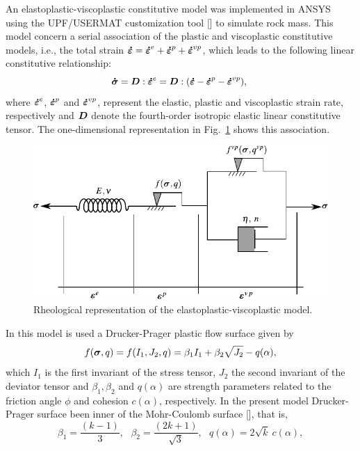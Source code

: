 \documentclass[a4paper,fleqn]{cas-sc}
\begin{document}
An elastoplastic-viscoplastic constitutive model was implemented in ANSYS using the UPF/USERMAT customization tool [] to simulate rock mass.  This model concern a serial association of the plastic and viscoplastic constitutive models, i.e., the total strain $\boldsymbol{\dot{\varepsilon}} = \boldsymbol{\dot{\varepsilon}}^{e} + \boldsymbol{\dot{\varepsilon}}^{p} + \boldsymbol{\dot{\varepsilon}}^{vp}$, which leads to the following linear constitutive relationship:
\begin{equation} \label{eq_constitutive_relationship_epvp}
	\boldsymbol{\dot{\sigma}} = \boldsymbol{D} : \boldsymbol{\dot{\varepsilon}}^{e} = \boldsymbol{D} : (\boldsymbol{\dot{\varepsilon}} - \boldsymbol{\dot{\varepsilon}}^{p} - \boldsymbol{\dot{\varepsilon}}^{vp}),\;
\end{equation}
where $\boldsymbol{\dot{\varepsilon}}^{e}$, $\boldsymbol{\dot{\varepsilon}}^{p}$ and $\boldsymbol{\dot{\varepsilon}}^{vp}$, represent the elastic, plastic and viscoplastic strain rate, respectively and $\boldsymbol{D}$ denote the fourth-order isotropic elastic linear constitutive tensor. The one-dimensional representation in Fig.~\ref{reological_scheme} shows this association. 
\begin{figure}[h!]
	\centering
	\includegraphics[scale=1]{Rheological representation.pdf}
	\caption{Rheological representation of the elastoplastic-viscoplastic model.}
	\label{reological_scheme}
\end{figure}
In this model is used a Drucker-Prager plastic flow surface given by
\begin{equation}
	\label{eq:f_Drucker_Prager}
	f(\boldsymbol{\sigma},q) = f(I_1,J_2,q) = \beta_1 I_1 +\beta_2 \sqrt{J_2}-q(\alpha),
\end{equation}
which $I_1$ is the first invariant of the stress tensor, $J_2$ the second invariant of the deviator tensor and $\beta_1, \beta_2$ and $q(\alpha)$ are strength parameters related to the friction angle $\phi$ and cohesion $c(\alpha)$, respectively. In the present model Drucker-Prager surface been inner of the Mohr-Coulomb surface [], that is,
\begin{equation}
	\label{eq:f_DP_inscrita_MC}
	\beta_1 = \dfrac{(k-1)}{3}, ~~~ \beta_2 = \dfrac{(2k+1)}{\sqrt{3}}, ~~~
	q(\alpha) = 2\sqrt{k}~c(\alpha),
\end{equation}
\end{document}
